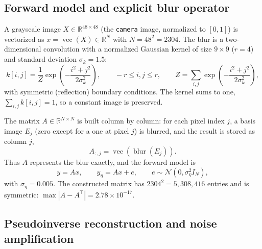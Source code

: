 \documentclass[11pt,a4paper]{article}
\newcommand{\R}{\mathbb{R}}
\newcommand{\T}{\top}
\newcommand{\vecop}{\operatorname{vec}}
\begin{document}
\subsection{Forward model and explicit blur operator}

A grayscale image $X\in\R^{48\times48}$ (the \texttt{camera} image, normalized to $[0,1]$) is
vectorized as $x=\vecop(X)\in\R^N$ with $N=48^2=2304$. The blur is a two-dimensional convolution
with a normalized Gaussian kernel of size $9\times9$ ($r=4$) and standard deviation
$\sigma_k=1.5$:
\begin{equation}
k[i,j]=\frac{1}{Z}\exp\!\left(-\frac{i^2+j^2}{2\sigma_k^2}\right),
\qquad -r\le i,j\le r,
\qquad
Z=\sum_{i,j}\exp\!\left(-\frac{i^2+j^2}{2\sigma_k^2}\right),
\label{eq:kernel}
\end{equation}
with symmetric (reflection) boundary conditions. The kernel sums to one,
$\sum_{i,j}k[i,j]=1$, so a constant image is preserved.

The matrix $A\in\R^{N\times N}$ is built column by column: for each pixel index $j$, a basis image
$E_j$ (zero except for a one at pixel $j$) is blurred, and the result is stored as column $j$,
\begin{equation}
A_{:,j}=\vecop\!\left(\operatorname{blur}(E_j)\right).
\label{eq:Acol}
\end{equation}
Thus $A$ represents the blur exactly, and the forward model is
\begin{equation}
y=Ax,\qquad y_\eta=Ax+e,\qquad e\sim\mathcal{N}(0,\sigma_\eta^2 I_N),
\label{eq:forward}
\end{equation}
with $\sigma_\eta=0.005$. The constructed matrix has $2304^2=5{,}308{,}416$ entries and is
symmetric: $\max|A-A^\T|=2.78\times10^{-17}$.

\subsection{Pseudoinverse reconstruction and noise amplification}
\end{document}
